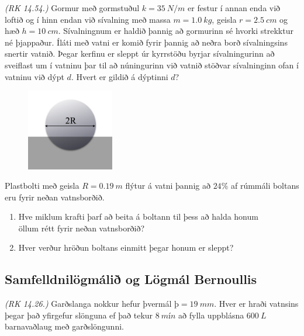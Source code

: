 \ifdefined \wholebook \else\documentclass[oneside]{book}\usepackage{EdlBook}\graphicspath{{figures/}}
\begin{document}
\begin{enumerate}[label = \textbf{Dæmi \thechapter.\arabic*.}]
\item \textit{(RK 14.54.)} Gormur með gormstuðul $k = \SI{35}{N/m}$ er festur í annan enda við loftið og í hinn endan við sívalning með massa $m = \SI{1.0}{kg}$,  geisla $r = \SI{2.5}{cm}$ og hæð $h = \SI{10}{cm}$. Sívalningnum er haldið þannig að gormurinn sé hvorki strekktur né þjappaður. Íláti með vatni er komið fyrir þannig að neðra borð sívalningsins snertir vatnið. Þegar kerfinu er sleppt úr kyrrstöðu byrjar sívalningurinn að sveiflast um í vatninu þar til að núningurinn við vatnið stöðvar sívalninginn ofan í vatninu við dýpt $d$. Hvert er gildið á dýptinni $d$?

\begin{minipage}{\linewidth}

\begin{figure}
\vspace{-1cm}
\includegraphics[width=1.5in]{images/kula.png}
\end{figure}

\item Plastbolti með geisla $R = \SI{0.19}{m}$ flýtur á vatni þannig að $24 \%$ af rúmmáli boltans eru fyrir neðan vatnsborðið.
\end{minipage}
\begin{enumerate}[label = \textbf{(\alph*)}]
    \item Hve miklum krafti þarf að beita á boltann til þess að halda honum \\ öllum rétt fyrir neðan vatnsborðið?
    
    \item Hver verður hröðun boltans einmitt þegar honum er sleppt?
\end{enumerate}


\subsection*{Samfelldnilögmálið og Lögmál Bernoullis}

\item \textit{(RK 14.26.)} Garðslanga nokkur hefur þvermál $þ = \SI{19}{mm}$. Hver er hraði vatnsins þegar það yfirgefur slönguna ef það tekur $\SI{8}{mín}$ að fylla uppblásna $\SI{600}{L}$ barnavaðlaug með garðslöngunni.



\end{enumerate}
\end{document}
